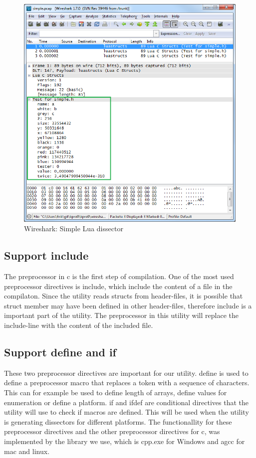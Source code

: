 \begin{figure}[ht]
	\includegraphics[width=\textwidth]{./sprints/img/wireshark_simple}
	\caption{Wireshark: Simple Lua dissector\label{fig:sp1wsstruct}}
\end{figure}

\subsection{Support \gls{include}}
The \gls{preprocessor} in \Gls{c} is the first step of compilation. One of the most used 
\gls{preprocessor} directives is \gls{include}, which include the content of a file 
in the compilaton. Since the \gls{utility} reads \glspl{struct} from \gls{header}-files, it is 
possible that \gls{struct} \gls{member} may have been defined in other \gls{header}-files, 
therefore \gls{include} is a important part of the \gls{utility}. The \gls{preprocessor} in 
this \gls{utility} will replace the \gls{include}-line with the content of the included file.

\subsection{Support \gls{define} and \gls{if}}
These two \gls{preprocessor} directives are important for our \gls{utility}. \gls{define} is 
used to define a \gls{preprocessor} macro that replaces a token with a 
sequence of characters. This can for example be used to define length of 
\glspl{array}, define values for enumeration or define a platform. \gls{if} and \gls{ifdef} 
are conditional directives that the \gls{utility} will use to check if macros are 
defined. This will be used when the \gls{utility} is generating \glspl{dissector} for 
different platforms. The functionallity for these \gls{preprocessor} directives and 
the other \gls{preprocessor} directives for \Gls{c}, was implemented by the \gls{library} we 
use, which is cpp.exe for \Gls{Windows} and \gls{agcc} for \Gls{mac} and \Gls{linux}.

